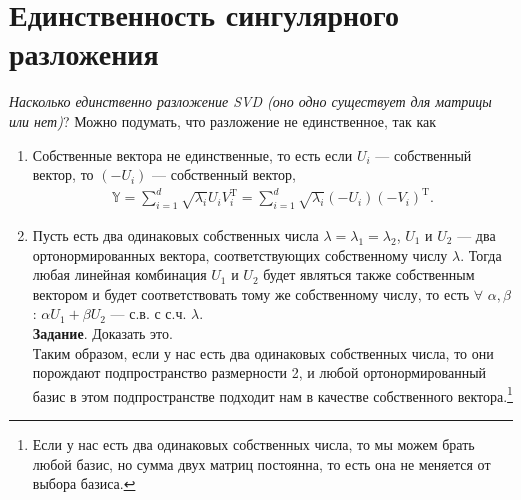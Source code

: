 \documentclass[specialist, 12pt,
subf, %
href, colorlinks=true,
substylefile = spbu.rtx,
]{disser}
\begin{document}


\section{Единственность сингулярного разложения}
\textit{Насколько единственно разложение SVD (оно одно существует для матрицы или нет)}?
Можно подумать, что разложение не единственное, так как
\begin{enumerate}
	\item Собственные вектора не единственные, то есть если $U_i$ --- собственный вектор, то $(-U_i)$ --- собственный вектор,
	\begin{gather*}
	\mathbb{Y} = \sum\limits_{i = 1}^d \sqrt{\lambda_i}U_i V_i^{\mathrm{T}} = \sum\limits_{i = 1}^d \sqrt{\lambda_i}(-U_i) (-V_i)^{\mathrm{T}}.
	\end{gather*}
	\item Пусть есть два одинаковых собственных числа $\lambda = \lambda_1 = \lambda_2$, $U_1$ и $U_2$ --- два ортонормированных вектора, соответствующих собственному числу $\lambda$. Тогда любая линейная комбинация $U_1$ и $U_2$ будет являться также собственным вектором и будет соответствовать тому же собственному числу, то есть $\forall$ $\alpha, \beta$: $\alpha U_1 + \beta U_2$ --- с.в. с с.ч. $\lambda$. \\
\textbf{Задание}. Доказать это.\\
Таким образом, если у нас есть два одинаковых собственных числа, то они порождают подпространство размерности 2, и любой ортонормированный базис в этом подпространстве подходит нам в качестве собственного вектора.\footnote{Если у нас есть два одинаковых собственных числа, то мы можем брать любой базис, но сумма двух матриц постоянна, то есть она не меняется от выбора базиса.  }
\end{enumerate}
\end{document}

